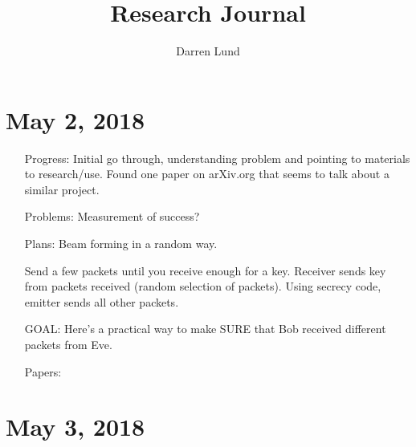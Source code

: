 \documentclass[11pt]{article}
\title{Research Journal}
\author{Darren Lund}
\begin{document}
\maketitle{}

\section{May 2, 2018}
\begin{itemize}
\item[Progress:]
Initial go through, understanding problem and pointing to materials to research/use.  Found one paper on arXiv.org that seems to talk about a similar project.

\item[Problems:]
Measurement of success?

\item[Plans:]
Beam forming in a random way.

Send a few packets until you receive enough for a key.
Receiver sends key from packets received (random selection of packets).
Using secrecy code, emitter sends all other packets.

GOAL: Here's a practical way to make SURE that Bob received different packets from Eve.

\item[Papers:]

\end{itemize}

\section{May 3, 2018}
\end{document}
